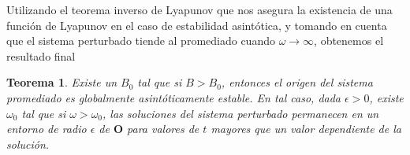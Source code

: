 \documentclass[letter]{article}
\newtheorem{theo}{Teorema}
\begin{document}
Utilizando el teorema inverso de Lyapunov que nos asegura la
existencia de una funci{\'o}n de Lyapunov en el caso de estabilidad
asint{\'o}tica, y tomando en cuenta que el sistema perturbado tiende
al promediado cuando $\omega\rightarrow\infty$, obtenemos el
resultado final
\begin{theo}
Existe un $B_0$ tal que si $B>B_0$, entonces el origen del sistema
promediado es globalmente asint{\'o}ticamente estable. En tal caso,
dada $\epsilon>0$, existe   $\omega_0$ tal que si
$\omega>\omega_0$, las soluciones del sistema perturbado
permanecen en un entorno de radio $\epsilon$ de $\mathbf{O}$ para
valores de $t$ mayores que un valor dependiente de la soluci{\'o}n.
\end{theo}
\end{document}
